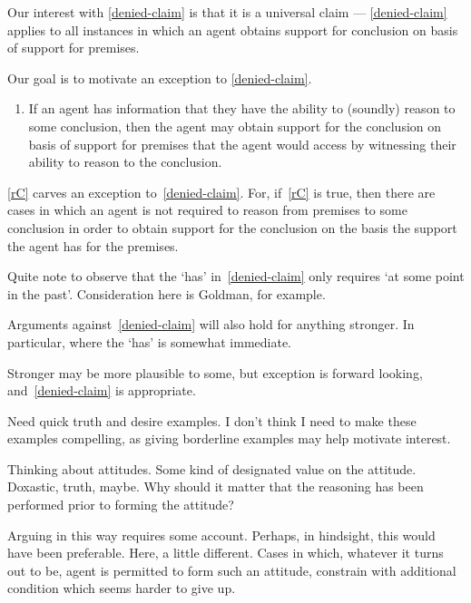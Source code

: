 \begin{note}[Alternative]
  Our interest with \ref{denied-claim} is that it is a universal claim --- \ref{denied-claim} applies to all instances in which an agent obtains support for conclusion on basis of support for premises.

  Our goal is to motivate an exception to \ref{denied-claim}.

  \begin{enumerate}[label=\rC{}, ref=\rC{}]
  \item\label{rC} If an agent has information that they have the ability to (soundly) reason to some conclusion, then the agent may obtain support for the conclusion on basis of support for premises that the agent would access by witnessing their ability to reason to the conclusion.
  \end{enumerate}

  \ref{rC} carves an exception to~\ref{denied-claim}.
  For, if~\ref{rC} is true, then there are cases in which an agent is not required to reason from premises to some conclusion in order to obtain support for the conclusion on the basis the support the agent has for the premises.
\end{note}

\begin{note}
  Quite note to observe that the `has' in~\ref{denied-claim} only requires `at some point in the past'.
  Consideration here is Goldman, for example.

  Arguments against~\ref{denied-claim} will also hold for anything stronger.
  In particular, where the `has' is somewhat immediate.

  Stronger may be more plausible to some, but exception is forward looking, and~\ref{denied-claim} is appropriate.
\end{note}

\begin{note}[Examples]
  Need quick truth and desire examples.
  I don't think I need to make these examples compelling, as giving borderline examples may help motivate interest.
\end{note}

\begin{note}
  Thinking about attitudes.
  Some kind of designated value on the attitude.
  Doxastic, truth, maybe.
  Why should it matter that the reasoning has been performed prior to forming the attitude?

  Arguing in this way requires some account.
  Perhaps, in hindsight, this would have been preferable.
  Here, a little different.
  Cases in which, whatever it turns out to be, agent is permitted to form such an attitude, constrain with additional condition which seems harder to give up.
\end{note}

